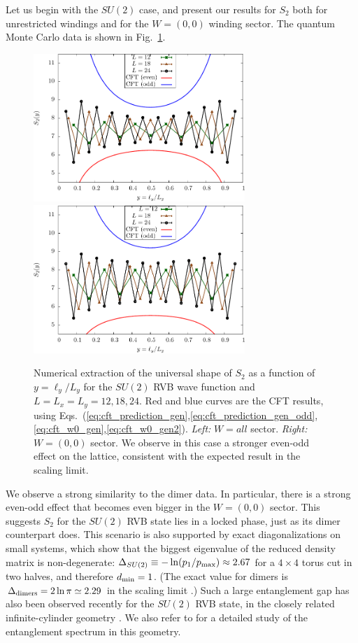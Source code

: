 \documentclass[11pt]{iopart}
\begin{document}
Let us begin with the $SU(2)$ case, and present our results for $S_2$ both for unrestricted windings and for the $W=(0,0)$ winding sector. The quantum Monte Carlo data is shown in Fig.~\ref{fig:SU2_shape}.\begin{figure}[ht]
 \begin{center}
  \includegraphics[width=8cm]{./figures/SU2_shape.pdf}
  \includegraphics[width=8cm]{./figures/SU2_shape_w0.pdf}
 \end{center}
\caption{Numerical extraction of the universal shape of $S_2$ as a function of $y=\ell_y/L_y$ for the $SU(2)$ RVB wave function and $L=L_x=L_y=12,18,24$. Red and blue curves are the CFT results, using Eqs.~(\ref{eq:cft_prediction_gen},\ref{eq:cft_prediction_gen_odd},\ref{eq:cft_w0_gen},\ref{eq:cft_w0_gen2}). \emph{Left:} $W=all$ sector.  \emph{Right:} $W=(0,0)$ sector. We observe in this case a stronger even-odd effect on the lattice, consistent with the expected result in the scaling limit.}
\label{fig:SU2_shape}
\end{figure}
We observe a strong similarity to the dimer data. In particular, there is a strong even-odd effect that becomes even bigger in the $W=(0,0)$ sector.
This suggests $S_2$ for the $SU(2)$ RVB state lies in a locked phase, just as its dimer counterpart does. 
This scenario is also supported by exact diagonalizations on small systems, which show that the biggest eigenvalue of the reduced density matrix is non-degenerate:  $\Delta_{SU(2)}\equiv -\ln (p_1/p_{\rm max}) \approx 2.67$ for a $4\times 4$ torus cut in two halves, and therefore $d_{\rm min}=1$. (The exact value for dimers is $\Delta_{\rm dimers}=2\ln \pi\simeq 2.29$ in the scaling limit \cite{Stephan2012}.) Such a large entanglement gap has also been observed recently for the $SU(2)$ RVB state, in the closely related infinite-cylinder geometry \cite{Poilblanc}. We also refer to \cite{Poilblanc} for a detailed study of the entanglement spectrum in this geometry.
\end{document}
